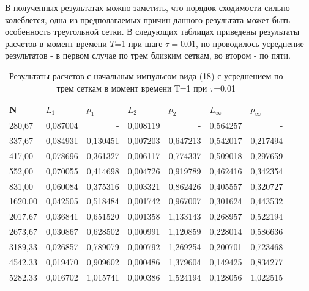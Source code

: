 \documentclass[14pt]{article}
\begin{document}
В полученных результатах можно заметить, что порядок сходимости сильно колеблется, одна из предполагаемых причин данного результата может быть особенность треугольной сетки. В следующих таблицах приведены результаты расчетов в момент времени $T$=1 при шаге $\tau=0.01$, но проводилось усреднение результатов - в первом случае по трем близким сеткам, во втором - по пяти.
\begin{table}[H]
\caption{Результаты расчетов с начальным импульсом вида (18) с усреднением по трем сеткам в момент времени Т=1 при $\tau$=0.01}
\begin{tabular}{|l|l|l|l|l|l|l|}
\hline
\multicolumn{1}{|l|}{N} & \multicolumn{1}{l|}{$L_1$}        & \multicolumn{1}{l|}{$p_1$} & \multicolumn{1}{l|}{$L_2$}     & \multicolumn{1}{l|}{$p_2$} & \multicolumn{1}{l|}{$L_\infty$} & \multicolumn{1}{l|}{$p_\infty$} \\ \hline
280,67   & 0,087004 & \multicolumn{1}{r|}{-} & 0,008119 & \multicolumn{1}{r|}{-}       & 0,564257 & \multicolumn{1}{r|}{-} \\ \hline
337,67   & 0,084931 & 0,130451               & 0,007203 & 0,647213 & 0,542017 & 0,217494               \\ \hline
417,00   & 0,078696 & 0,361327               & 0,006117 & 0,774337 & 0,509018 & 0,297659               \\ \hline
552,00   & 0,070055 & 0,414698               & 0,004726 & 0,919789 & 0,462416 & 0,342354               \\ \hline
831,00   & 0,060084 & 0,375316               & 0,003321 & 0,862426 & 0,405557 & 0,320727               \\ \hline
1620,00  & 0,042505 & 0,518484               & 0,001742 & 0,967007 & 0,301624 & 0,443532               \\ \hline
2017,67  & 0,036841 & 0,651520               & 0,001358 & 1,133143 & 0,268957 & 0,522194               \\ \hline
2673,67  & 0,030867 & 0,628502               & 0,000991 & 1,120859 & 0,228014 & 0,586636               \\ \hline
3189,33  & 0,026857 & 0,789079               & 0,000792 & 1,269254 & 0,200701 & 0,723468               \\ \hline
4542,33  & 0,019470 & 0,909602               & 0,000486 & 1,379604 & 0,149425 & 0,834277               \\ \hline
5282,33  & 0,016702 & 1,015741               & 0,000386 & 1,524194 & 0,128056 & 1,022515               \\ \hline

\end{tabular}
\end{table}
\end{document}
